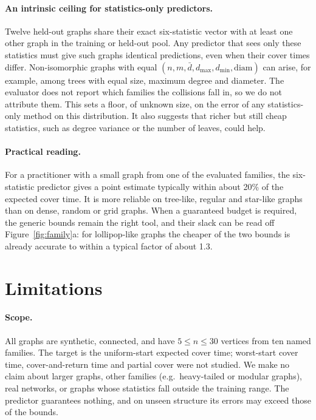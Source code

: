 \documentclass{article}
\newcommand{\diam}{\mathrm{diam}}
\begin{document}
\paragraph{An intrinsic ceiling for statistics-only predictors.}
Twelve held-out graphs share their exact six-statistic vector with at least one other graph in the training or held-out pool. %
Any predictor that sees only these statistics must give such graphs identical predictions, even when their cover times differ. Non-isomorphic graphs with equal $(n,m,\bar d, d_{\max}, d_{\min},\diam)$ can arise, for example, among trees with equal size, maximum degree and diameter. The evaluator does not report which families the collisions fall in, so we do not attribute them. This sets a floor, of unknown size, on the error of any statistics-only method on this distribution. It also suggests that richer but still cheap statistics, such as degree variance or the number of leaves, could help.

\paragraph{Practical reading.}
For a practitioner with a small graph from one of the evaluated families, the six-statistic predictor gives a point estimate typically within about 20\% of the expected cover time. It is more reliable on tree-like, regular and star-like graphs than on dense, random or grid graphs. When a guaranteed budget is required, the generic bounds remain the right tool, and their slack can be read off Figure~\ref{fig:family}a: for lollipop-like graphs the cheaper of the two bounds is already accurate to within a typical factor of about 1.3.

\section{Limitations}
\label{sec:limits}

\paragraph{Scope.} All graphs are synthetic, connected, and have $5\le n\le 30$ vertices from ten named families. The target is the uniform-start expected cover time; worst-start cover time, cover-and-return time and partial cover were not studied. We make no claim about larger graphs, other families (e.g.\ heavy-tailed or modular graphs), real networks, or graphs whose statistics fall outside the training range. The predictor guarantees nothing, and on unseen structure its errors may exceed those of the bounds.
\end{document}
